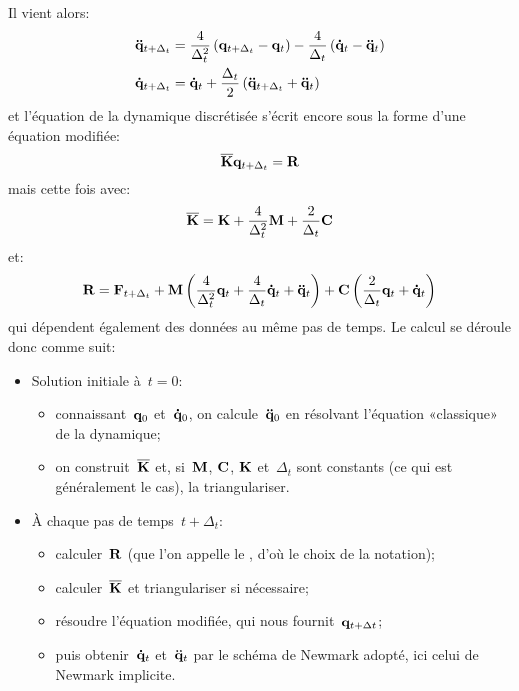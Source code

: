 Il vient alors:
\begin{equation}
\begin{aligned}
&\VV{\ddot q}_{t+\Delta_t} = \frac4{\Delta_t^2} \left( \VV{q}_{t+\Delta_t} -\VV{q}_t\right)
-\frac4{\Delta_t}\left( \VV{\dot q}_t - \VV{\ddot q}_t\right)\\
&\VV{\dot q}_{t+\Delta_t} = \VV{\dot q}_t + \frac{\Delta_t}2\left( \VV{\ddot q}_{t+\Delta_t} + \VV{\ddot q}_t\right)
\end{aligned}
\end{equation}
et l'équation de la dynamique discrétisée s'écrit encore sous la forme d'une équation modifiée:
\begin{equation}
\MM{\overline{K}} \VV{q}_{t+\Delta_t} = \VV{R}
\end{equation}
mais cette fois avec:
\begin{equation}
\MM{\overline{K}} = \MM{K}+\frac4{\Delta_t^2}\MM{M}+\frac2{\Delta_t}\MM{C}
\end{equation}
et:
\begin{equation}
\VV{R} = \VV{F}_{t+\Delta_t} + \MM{M}\left(\frac4{\Delta_t^2}\VV{q}_t + \frac4{\Delta_t}\VV{\dot q}_t
+ \VV{\ddot q}_t\right)
+\MM{C}\left( \frac2{\Delta_t}\VV{q}_t + \VV{\dot q}_t\right)
\end{equation}
qui dépendent également des données au même pas de temps.
\medskipvm
Le calcul se déroule donc comme suit:
\begin{itemize}
  \item Solution initiale à~$t=0$:
	\begin{itemize}
	\item connaissant~$\VV{q}_0$ et~$\VV{\dot q}_0$, on calcule~$\VV{\ddot q}_0$ en résolvant
	l'équation «classique» de la dynamique;
	\item on construit~$\MM{\overline{K}}$ et, si~$\MM{M}$, $\MM{C}$, $\MM{K}$ et~$\Delta_t$ sont constants
	(ce qui est généralement le cas), la triangulariser.
	\end{itemize}
  \item À chaque pas de temps~$t+\Delta_t$:
	\begin{itemize}
	\item calculer~$\VV{R}$ (que l'on appelle le , d'où le choix de la notation);
	\item calculer~$\MM{\overline{K}}$ et triangulariser si nécessaire;
	\item résoudre l'équation modifiée, qui nous fournit~$\VV{q}_{t+\Delta t}$;
	\item puis obtenir~$\VV{\dot q}_t$ et~$\VV{\ddot q}_t$ par le schéma de Newmark adopté,
	ici celui de Newmark implicite.
	\end{itemize}
\end{itemize}
